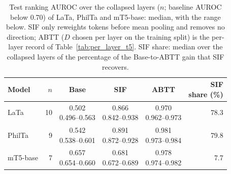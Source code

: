 \begin{table}[t]
\centering
\scriptsize
\setlength{\tabcolsep}{3pt}
\begin{tabular}{lrcccr}
\toprule
\textbf{Model} & $n$ & Base & SIF & ABTT & \makecell{SIF\\share (\%)} \\
\midrule
LaTa & 10 & \makecell{0.502\\0.496--0.563} & \makecell{0.866\\0.842--0.938} & \makecell{0.970\\0.962--0.973} & 78.3 \\
PhilTa & 9 & \makecell{0.542\\0.538--0.601} & \makecell{0.891\\0.872--0.928} & \makecell{0.981\\0.973--0.984} & 79.8 \\
mT5-base & 7 & \makecell{0.657\\0.654--0.660} & \makecell{0.681\\0.672--0.689} & \makecell{0.978\\0.974--0.982} & 7.7 \\
\bottomrule
\end{tabular}
\caption{Test ranking AUROC over the collapsed layers ($n$; baseline AUROC below 0.70) of LaTa, PhilTa and mT5-base: median, with the range below. SIF only reweights tokens before mean pooling and removes no direction; ABTT ($D$ chosen per layer on the training split) is the per-layer record of Table~\ref{tab:per_layer_t5}. SIF share: median over the collapsed layers of the percentage of the Base-to-ABTT gain that SIF recovers.}
\label{tab:sif_collapsed}
\end{table}

